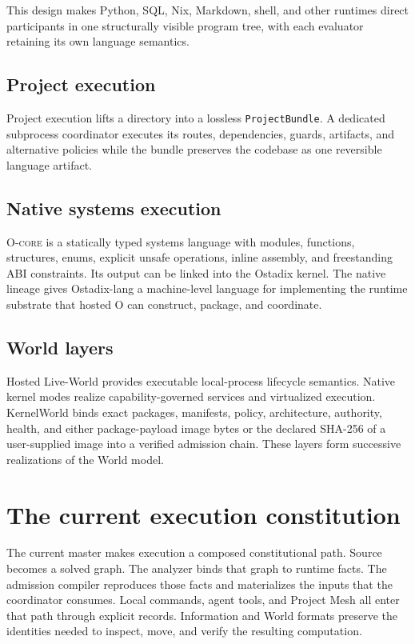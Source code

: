 \documentclass[11pt,oneside]{article}
\newcommand{\ocore}{{\mdseries\textsc{O-core}}}
\begin{document}
This design makes Python, SQL, Nix, Markdown, shell, and other runtimes direct
participants in one structurally visible program tree, with each evaluator
retaining its own language semantics.

\subsection{Project execution}

Project execution lifts a directory into a lossless
\texttt{ProjectBundle}. A dedicated subprocess coordinator executes its
routes, dependencies, guards, artifacts, and alternative policies while the
bundle preserves the codebase as one reversible language artifact.

\subsection{Native systems execution}

\ocore{} is a statically typed systems language with modules,
functions, structures, enums, explicit unsafe operations, inline assembly,
and freestanding ABI constraints. Its output can be linked into the Ostadix
kernel. The native lineage gives Ostadix-lang a machine-level
language for implementing the runtime substrate that hosted O can construct,
package, and coordinate.

\subsection{World layers}

Hosted Live-World provides executable local-process lifecycle semantics.
Native kernel modes realize capability-governed services and virtualized
execution. KernelWorld binds exact packages, manifests, policy, architecture,
authority, health, and either package-payload image bytes or the declared
SHA-256 of a user-supplied image into a verified admission chain. These
layers form successive realizations of the World model.

\section{The current execution constitution}
\label{sec:constitution}

The current master makes execution a composed constitutional path. Source
becomes a solved graph. The analyzer binds that graph to runtime facts. The
admission compiler reproduces those facts and materializes the inputs that the
coordinator consumes. Local commands, agent tools, and Project Mesh all enter
that path through explicit records. Information and World formats preserve the
identities needed to inspect, move, and verify the resulting computation.
\end{document}
